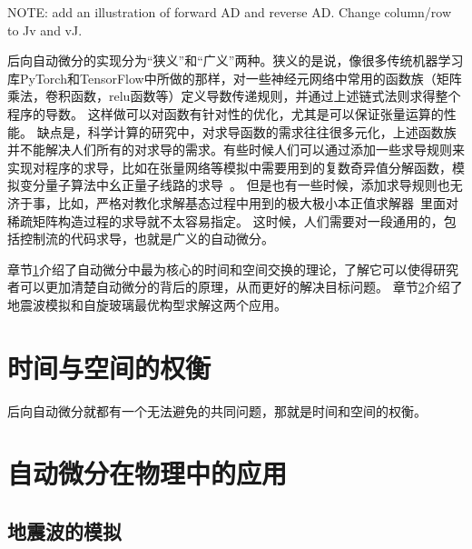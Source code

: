 \documentclass[A4,twoside,fontset=ubuntu,UTF8]{ctexart}
\begin{document}
NOTE: add an illustration of forward AD and reverse AD. Change column/row to Jv and vJ.

    后向自动微分的实现分为“狭义”和“广义”两种。狭义的是说，像很多传统机器学习库PyTorch和TensorFlow中所做的那样，对一些神经元网络中常用的函数族（矩阵乘法，卷积函数，relu函数等）定义导数传递规则，并通过上述链式法则求得整个程序的导数。
这样做可以对函数有针对性的优化，尤其是可以保证张量运算的性能。
缺点是，科学计算的研究中，对求导函数的需求往往很多元化，上述函数族并不能解决人们所有的对求导的需求。有些时候人们可以通过添加一些求导规则来实现对程序的求导，比如在张量网络等模拟中需要用到的复数奇异值分解函数\cite{Wan2019,Liao2019}，模拟变分量子算法中幺正量子线路的求导~\cite{Luo2019}。
但是也有一些时候，添加求导规则也无济于事，比如，严格对教化求解基态过程中用到的极大极小本正值求解器~\cite{Xie2020}里面对稀疏矩阵构造过程的求导就不太容易指定。
这时候，人们需要对一段通用的，包括控制流的代码求导，也就是广义的自动微分。

    章节\ref{sec:timespace}介绍了自动微分中最为核心的时间和空间交换的理论，了解它可以使得研究者可以更加清楚自动微分的背后的原理，从而更好的解决目标问题。
    章节\ref{sec:applications}介绍了地震波模拟和自旋玻璃最优构型求解这两个应用。

    \section{时间与空间的权衡}\label{sec:timespace}
后向自动微分就都有一个无法避免的共同问题，那就是时间和空间的权衡。


\section{自动微分在物理中的应用}\label{sec:applications}
\baselineskip
\subsection{地震波的模拟}

\baselineskip
\end{document}
